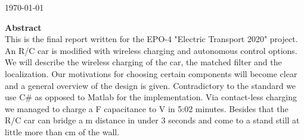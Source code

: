 \documentclass[12pt]{scrreprt}
\begin{document}
\begin{titlepage}


{\large \today}\\ [1.5cm]


 
% 
\vspace{3cm} %

\textbf{Abstract} \\ 
This is the final report written for the EPO-4 "Electric Transport 2020" project. 
An R/C car is modified with wireless charging and autonomous control options. 
We will describe the wireless charging of the car, the matched filter and the localization.%
Our motivations for choosing certain components will become clear and a general overview of the design is given. 
Contradictory to the standard we use C\# as opposed to Matlab for the implementation. 
Via contact-less charging we managed to charge a \unit[35]{F} capacitance to \unit[20]{V} in 5:02 minutes. 
Besides that the R/C car can bridge a \unit[3]{m} distance in under 3 seconds and come to a stand still at little more than \unit[10]{cm} of the wall.

\vfill %

\end{titlepage}
\end{document}

